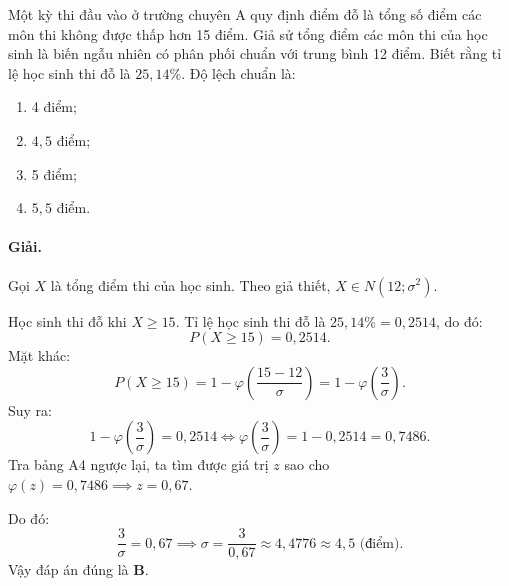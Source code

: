 \begin{vidu}[VD 2]
Một kỳ thi đầu vào ở trường chuyên A quy định điểm đỗ là tổng số điểm các môn thi không được thấp hơn 15 điểm. Giả sử tổng điểm các môn thi của học sinh là biến ngẫu nhiên có phân phối chuẩn với trung bình 12 điểm. Biết rằng tỉ lệ học sinh thi đỗ là $25{,}14\%$. Độ lệch chuẩn là:
\begin{enumerate}[label=\Alph*.]
    \item 4 điểm;
    \item $4{,}5$ điểm;
    \item 5 điểm;
    \item $5{,}5$ điểm.
\end{enumerate}

\paragraph{Giải.}
Gọi $X$ là tổng điểm thi của học sinh. Theo giả thiết, $X \in N(12; \sigma^2)$.

Học sinh thi đỗ khi $X \ge 15$. Tỉ lệ học sinh thi đỗ là $25{,}14\% = 0{,}2514$, do đó:
\[
P(X \ge 15) = 0{,}2514.
\]
Mặt khác:
\[
P(X \ge 15) = 1 - \varphi\left(\frac{15 - 12}{\sigma}\right) = 1 - \varphi\left(\frac{3}{\sigma}\right).
\]
Suy ra:
\[
1 - \varphi\left(\frac{3}{\sigma}\right) = 0{,}2514 \iff \varphi\left(\frac{3}{\sigma}\right) = 1 - 0{,}2514 = 0{,}7486.
\]
Tra bảng A4 ngược lại, ta tìm được giá trị $z$ sao cho $\varphi(z) = 0{,}7486 \implies z = 0{,}67$.

Do đó:
\[
\frac{3}{\sigma} = 0{,}67 \implies \sigma = \frac{3}{0{,}67} \approx 4{,}4776 \approx 4{,}5 \text{ (điểm)}.
\]
Vậy đáp án đúng là \textbf{B}.
\end{vidu}

